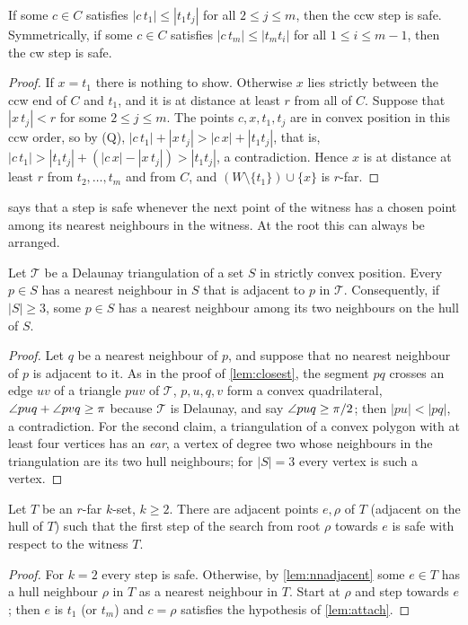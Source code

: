 \begin{lemma}[attachment]\label{lem:attach}
If some $c\in C$ satisfies $|c\,t_1|\le|t_1t_j|$ for all $2\le j\le m$, then
the ccw step is safe. Symmetrically, if some $c\in C$ satisfies
$|c\,t_m|\le|t_mt_i|$ for all $1\le i\le m-1$, then the cw step is safe.
\end{lemma}
\begin{proof}
If $x=t_1$ there is nothing to show. Otherwise $x$ lies strictly between the
ccw end of $C$ and $t_1$, and it is at distance at least $r$ from all of $C$.
Suppose that $|x\,t_j|<r$ for some $2\le j\le m$. The points $c,x,t_1,t_j$ are
in convex position in this ccw order, so by (Q),
$|c\,t_1|+|x\,t_j|>|c\,x|+|t_1t_j|$, that is,
$|c\,t_1|>|t_1t_j|+(|c\,x|-|x\,t_j|)>|t_1t_j|$, a contradiction. Hence $x$ is
at distance at least $r$ from $t_2,\dots,t_m$ and from $C$, and
$(W\setminus\{t_1\})\cup\{x\}$ is $r$-far.
\end{proof}

 says that a step is safe whenever the next point of the
witness has a chosen point among its nearest neighbours in the witness. At the
root this can always be arranged.

\begin{lemma}\label{lem:nnadjacent}
Let $\mathcal T$ be a Delaunay triangulation of a set $S$ in strictly convex
position. Every $p\in S$ has a nearest neighbour in $S$ that is adjacent to $p$
in $\mathcal T$. Consequently, if $|S|\ge3$, some $p\in S$ has a nearest
neighbour among its two neighbours on the hull of $S$.
\end{lemma}
\begin{proof}
Let $q$ be a nearest neighbour of $p$, and suppose that no nearest neighbour
of $p$ is adjacent to it. As in the proof of \cref{lem:closest}, the segment
$pq$ crosses an edge $uv$ of a triangle $puv$ of $\mathcal T$, $p,u,q,v$ form a
convex quadrilateral, $\angle puq+\angle pvq\ge\pi$ because $\mathcal T$ is
Delaunay, and say $\angle puq\ge\pi/2$; then $|pu|<|pq|$, a contradiction. For
the second claim, a triangulation of a convex polygon with at least four
vertices has an \emph{ear}, a vertex of degree two whose neighbours in the
triangulation are its two hull neighbours; for $|S|=3$ every vertex is such a
vertex.
\end{proof}

\begin{theorem}\label{thm:firststep}
Let $T$ be an $r$-far $k$-set, $k\ge2$. There are adjacent points $e,\rho$ of
$T$ (adjacent on the hull of $T$) such that the first step of the search from
root $\rho$ towards $e$ is safe with respect to the witness $T$.
\end{theorem}
\begin{proof}
For $k=2$ every step is safe. Otherwise, by \cref{lem:nnadjacent} some $e\in T$
has a hull neighbour $\rho$ in $T$ as a nearest neighbour in $T$. Start at
$\rho$ and step towards $e$; then $e$ is $t_1$ (or $t_m$) and $c=\rho$
satisfies the hypothesis of \cref{lem:attach}.
\end{proof}

